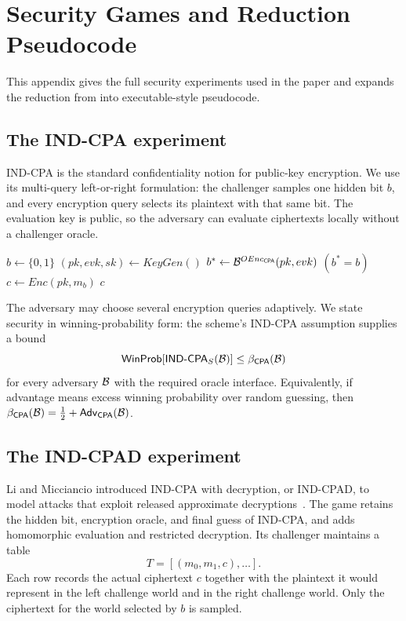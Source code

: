 \section{Security Games and Reduction Pseudocode}
\label{app:security-games}

This appendix gives the full security experiments used in the paper and
expands the reduction from  into
executable-style pseudocode.

\subsection{The IND-CPA experiment}
\label{app:ind-cpa-game}

IND-CPA is the standard confidentiality notion for public-key encryption.
We use its multi-query left-or-right formulation: the challenger samples one
hidden bit \(b\), and every encryption query selects its plaintext with that
same bit.
The evaluation key is public, so the adversary can evaluate ciphertexts
locally without a challenger oracle.

\begin{algorithm}
\caption{Multi-query left-or-right IND-CPA experiment}
\label{alg:ind-cpa-game}
\begin{algorithmic}
    \State $b \gets \{0,1\}$
    \State $(pk,evk,sk) \gets KeyGen()$
    \State $b^* \gets \mathcal{B}^{OEnc_{\mathsf{CPA}}}(pk,evk)$
    \State \Return $(b^*=b)$
  \EndProcedure
  \State
    \State $c \gets Enc(pk,m_b)$
    \State \Return $c$
  \EndProcedure
\end{algorithmic}
\end{algorithm}

The adversary may choose several encryption queries adaptively.
We state security in winning-probability form: the scheme's IND-CPA assumption
supplies a bound
\[
 \mathsf{WinProb}[\mathsf{IND\text{-}CPA}_{S}(\mathcal{B})]
 \leq \beta_{\mathsf{CPA}}(\mathcal{B})
\]
for every adversary \(\mathcal{B}\) with the required oracle interface.
Equivalently, if advantage means excess winning probability over random
guessing, then
\(\beta_{\mathsf{CPA}}(\mathcal{B})=\tfrac12+\mathsf{Adv}_{\mathsf{CPA}}(\mathcal{B})\).

\subsection{The IND-CPAD experiment}
\label{app:ind-cpad-game}

Li and Micciancio introduced IND-CPA with decryption, or IND-CPAD, to model
attacks that exploit released approximate decryptions~\cite{lm}.
The game retains the hidden bit, encryption oracle, and final guess of
IND-CPA, and adds homomorphic evaluation and restricted decryption.
Its challenger maintains a table
\[
 T=[(m_0,m_1,c),\ldots].
\]
Each row records the actual ciphertext \(c\) together with the plaintext it
would represent in the left challenge world and in the right challenge world.
Only the ciphertext for the world selected by \(b\) is sampled.

